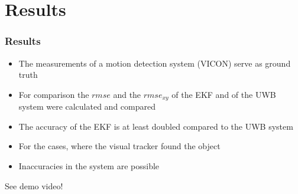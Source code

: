 \documentclass{beamer}[10]
\begin{document}
\section{Results}
\frame{\tableofcontents[currentsection]}

\begin{frame}
	\frametitle{Results}
	\begin{itemize}
	\pause
	\item The measurements of a motion detection system (VICON) serve as ground truth
	\pause
	\item For comparison the $\textit{rmse}$ and the $\textit{rmse}_{xy}$ of the EKF and of the UWB system were calculated and compared
	\pause
	\item The accuracy of the EKF is at least doubled compared to the UWB system
	\pause
	\item For the cases, where the visual tracker found the object
	\pause
	\item Inaccuracies in the system are possible
	\end{itemize}
	\vspace{1cm}
	See demo video!
\end{frame}
\end{document}
